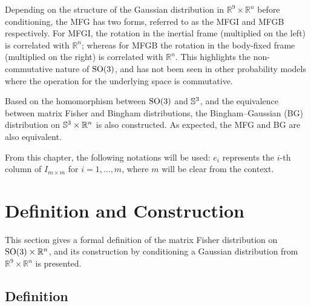Depending on the structure of the Gaussian distribution in $\mathbb{R}^9\times \mathbb{R}^n$ before conditioning, the MFG has two forms, referred to as the MFGI and MFGB respectively.
For MFGI, the rotation in the inertial frame (multiplied on the left) is correlated with $\mathbb{R}^n$; whereas for MFGB the rotation in the body-fixed frame (multiplied on the right) is correlated with $\mathbb{R}^n$.
This highlights the non-commutative nature of $\mathrm{SO}(3)$, and has not been seen in other probability models where the operation for the underlying space is commutative.

Based on the homomorphism between $\mathrm{SO}(3)$ and $\mathbb{S}^3$, and the equivalence between matrix Fisher and Bingham distributions, the Bingham--Gaussian (BG) distribution on $\mathbb{S}^3\times \mathbb{R}^n$ is also constructed.
As expected, the MFG and BG are also equivalent.

From this chapter, the following notations will be used: $e_i$ represents the $i$-th column of $I_{m\times m}$ for $i=1,\ldots,m$, where $m$ will be clear from the context.

\section{Definition and Construction}

This section gives a formal definition of the matrix Fisher distribution on $\mathrm{SO}(3)\times\mathbb{R}^n$, and its construction by conditioning a Gaussian distribution from $\mathbb{R}^9\times \mathbb{R}^n$ is presented.

\subsection{Definition}

